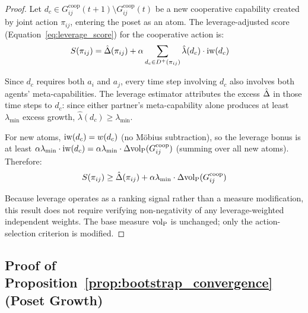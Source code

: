 \begin{proof}
Let $d_c \in G^{\mathrm{coop}}_{ij}(t+1) \setminus G^{\mathrm{coop}}_{ij}(t)$
be a new cooperative capability created by joint action $\pi_{ij}$, entering
the poset as an atom. The leverage-adjusted score
(Equation~\eqref{eq:leverage_score}) for the cooperative action is:
\begin{align*}
S(\pi_{ij}) &= \hat{\Delta}(\pi_{ij}) + \alpha \sum_{d_c \in D^+(\pi_{ij})}
  \hat{\lambda}(d_c) \cdot \operatorname{iw}(d_c)
\end{align*}

Since $d_c$ requires both $a_i$ and $a_j$, every time step involving $d_c$
also involves both agents' meta-capabilities. The leverage estimator attributes
the excess $\hat{\Delta}$ in those time steps to $d_c$: since either partner's
meta-capability alone produces at least $\lambda_{\min}$ excess growth,
$\hat{\lambda}(d_c) \geq \lambda_{\min}$.

For new atoms, $\operatorname{iw}(d_c) = w(d_c)$ (no M\"{o}bius subtraction), so the
leverage bonus is at least $\alpha \lambda_{\min} \cdot \operatorname{iw}(d_c) = \alpha
\lambda_{\min} \cdot \Delta {\operatorname{vol}_{\mathrm{P}}}(G^{\mathrm{coop}}_{ij})$ (summing over all
new atoms). Therefore:
\[
S(\pi_{ij}) \geq \hat{\Delta}(\pi_{ij}) + \alpha \lambda_{\min} \cdot
\Delta {\operatorname{vol}_{\mathrm{P}}}(G^{\mathrm{coop}}_{ij})
\]

Because leverage operates as a ranking signal rather than a measure
modification, this result does not require verifying non-negativity of any
leverage-weighted independent weights. The base measure ${\operatorname{vol}_{\mathrm{P}}}$ is unchanged;
only the action-selection criterion is modified.
\end{proof}


\subsection{Proof of Proposition~\ref{prop:bootstrap_convergence} (Poset Growth)}
\label{app:proof_bootstrap}


